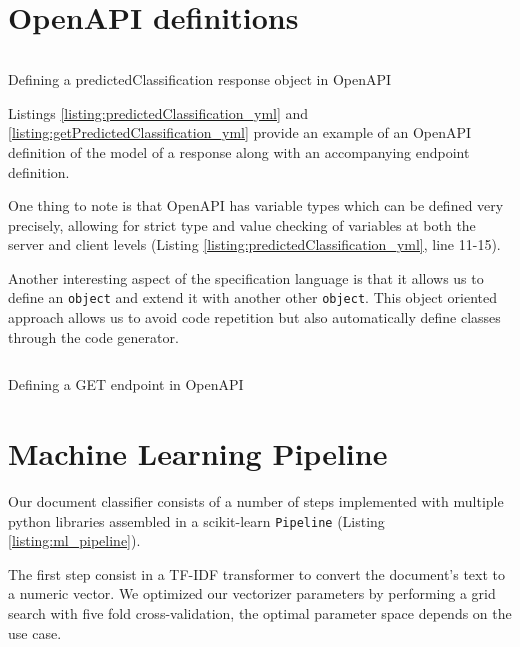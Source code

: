 \documentclass{l4proj}
\begin{document}


\section{OpenAPI definitions}

\begin{listing}[H]
    \inputminted{yaml}{code/predictedClassification.yml}
    \caption{Defining a predictedClassification response object in OpenAPI}
    \label{listing:predictedClassification_yml}
\end{listing}

Listings \ref{listing:predictedClassification_yml} and \ref{listing:getPredictedClassification_yml} provide an example of an OpenAPI definition of the model of a response along with an accompanying endpoint definition.

One thing to note is that OpenAPI has variable types which can be defined very precisely, allowing for strict type and value checking of variables at both the server and client levels (Listing \ref{listing:predictedClassification_yml}, line 11-15).

Another interesting aspect of the specification language is that it allows us to define an \verb|object| and extend it with another other \verb|object|.
This object oriented approach allows us to avoid code repetition but also automatically define classes through the code generator.

\begin{listing}[H]
    \inputminted{yaml}{code/getPredictedClassification.yml}
    \caption{Defining a GET endpoint in OpenAPI}
    \label{listing:getPredictedClassification_yml}
\end{listing}

\section{Machine Learning Pipeline}
Our document classifier consists of a number of steps implemented with multiple python libraries assembled in a scikit-learn \verb|Pipeline| (Listing \ref{listing:ml_pipeline}).

The first step consist in a TF-IDF transformer to convert the document's text to a numeric vector.
We optimized our vectorizer parameters by performing a grid search with five fold cross-validation, the optimal parameter space depends on the use case.
\end{document}
